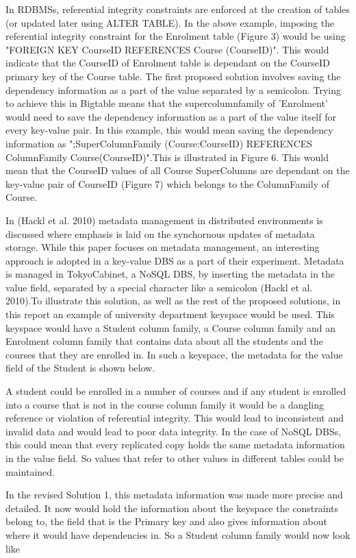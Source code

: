 In RDBMSs, referential integrity constraints are enforced at the creation of
tables (or updated later using ALTER TABLE). In the above example, imposing the
referential integrity constraint for the Enrolment table (Figure 3) would be
using "FOREIGN KEY CourseID REFERENCES Course (CourseID)". This would indicate
that the CourseID of Enrolment table is dependant on the CourseID primary key of
the Course table.
The first proposed solution involves saving the dependency information as a part
of the value separated by a semicolon. Trying to achieve this in Bigtable means
that the supercolumnfamily of 'Enrolment' would need to save the dependency
information as a part of the value itself for every key-value pair. In this
example, this would mean saving the dependency information as 
";SuperColumnFamily (Course:CourseID) REFERENCES ColumnFamily
Course(CourseID)".This is illustrated in Figure 6. This would mean that the
CourseID values of all Course SuperColumns are dependant on the key-value pair
of CourseID (Figure 7) which belongs to the ColumnFamily of Course.

In (Hackl et al. 2010) metadata management in distributed environments is
discussed where emphasis is laid on the synchornous updates of metadata storage.
While this paper focuses on metadata management, an interesting approach is
adopted in a key-value DBS as a part of their experiment. Metadata is managed in
TokyoCabinet, a NoSQL DBS, by inserting the metadata in the value field,
separated by a special character like a semicolon (Hackl et al. 2010).To
illustrate this solution, as well as the rest of the proposed solutions, in this
report an example of university department keyspace would be used. This keyspace
would have a Student column family, a Course column family and an Enrolment
column family that contains data about all the students and the courses that
they are enrolled in. In such a keyspace, the metadata for the value field of
the Student is shown below.

A student could be enrolled in a number of courses and if any student is
enrolled into a course that is not in the course column family it would be a
dangling reference or violation of referential integrity. This would lead to
inconsistent and invalid data and would lead to poor data integrity.
In the case of NoSQL DBSs, this could mean that every replicated copy holds the
same metadata information in the value field. So values that refer to other
values in different tables could be maintained.

In the revised Solution 1, this metadata information was made more precise and
detailed. It now would hold the information about the keyspace the constraints
belong to, the field that is the Primary key and also gives information about
where it would have dependencies in. So a Student column family would now look
like


